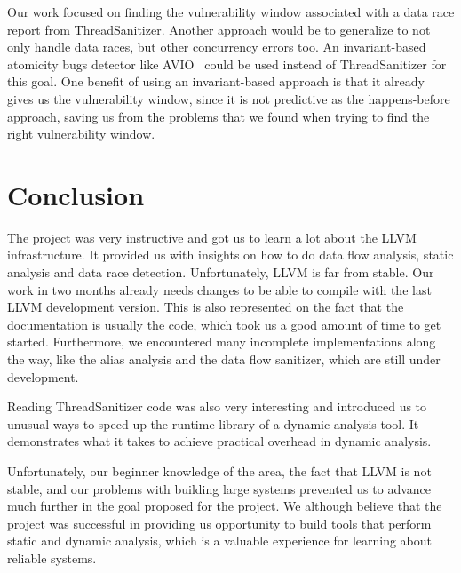\documentclass{acm_proc_article-sp}
\begin{document}
Our work focused on finding the vulnerability window associated with a data race report from ThreadSanitizer. Another approach would be to generalize to not only handle data races, but other concurrency errors too. An invariant-based atomicity bugs detector like AVIO~\cite{lu2006avio} could be used instead of ThreadSanitizer for this goal. One benefit of using an invariant-based approach is that it already gives us the vulnerability window, since it is not predictive as the happens-before approach, saving us from the problems that we found when trying to find the right vulnerability window. 

\section{Conclusion}

The project was very instructive and got us to learn a lot about the LLVM infrastructure. It provided us with insights on how to do data flow analysis, static analysis and data race detection.  Unfortunately, LLVM is far from stable. Our work in two months already needs changes to be able to compile with the last LLVM development version. This is also represented on the fact that the documentation is usually the code, which took us a good amount of time to get started. Furthermore, we encountered many incomplete implementations along the way, like the alias analysis and the data flow sanitizer, which are still under development.

Reading ThreadSanitizer code was also very interesting and introduced us to unusual ways to speed up the runtime library of a dynamic analysis tool. It demonstrates what it takes to achieve practical overhead in dynamic analysis.

Unfortunately, our beginner knowledge of the area, the fact that LLVM is not stable, and our problems with building large systems prevented us to advance much further in the goal proposed for the project. We although believe that the project was successful in providing us opportunity to build tools that perform static and dynamic analysis, which is a valuable experience for learning about reliable systems.
\end{document}
